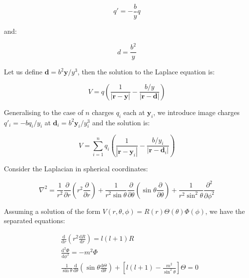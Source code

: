 \documentclass[12pt]{article}
\begin{document}
\begin{equation}
    q' = -\frac{b}{y} q
\end{equation}

and:

\begin{equation}
    d = \frac{b^{2}}{y}
\end{equation}

Let us define $\mathbf{d} = b^{2} \mathbf{y}/y^{3}$, then the solution to the Laplace equation is:

\begin{equation}
    V = q \left( \frac{1}{\left\lvert \mathbf{r} - \mathbf{y} \right\rvert} - \frac{b/y}{\left\lvert \mathbf{r} - \mathbf{d} \right\rvert} \right)
\end{equation}

Generalising to the case of $n$ charges $q_{i}$ each at $\mathbf{y}_{i}$, we introduce image charges $q'_{i} = -bq_{i}/y_{i}$ at $\mathbf{d}_{i} = b^{2} \mathbf{y}_{i}/y_{i}^{3}$ and the solution is:

\begin{equation}
    V = \sum_{i = 1}^{n} q_{i} \left( \frac{1}{\left\lvert \mathbf{r} - \mathbf{y}_{i} \right\rvert} - \frac{b/y_{i}}{\left\lvert \mathbf{r} - \mathbf{d}_{i} \right\rvert} \right)
\end{equation}

Consider the Laplacian in spherical coordinates:

\begin{equation}
    \nabla^{2} = \frac{1}{r^{2}} \frac{\partial}{\partial r} \left( r^{2} \frac{\partial}{\partial r} \right) + \frac{1}{r^{2} \sin{\theta}} \frac{\partial}{\partial \theta} \left( \sin{\theta} \frac{\partial}{\partial \theta} \right) + \frac{1}{r^{2} \sin^{2}{\theta}} \frac{\partial^{2}}{\partial \phi^{2}}
\end{equation}

Assuming a solution of the form $V(r, \theta, \phi) = R(r) \Theta(\theta) \Phi(\phi)$, we have the separated equations:

\begin{equation}
    \begin{split}
        &\frac{\mathrm{d}}{\mathrm{d}r} \left( r^2 \frac{\mathrm{d}R}{\mathrm{d}r} \right) = l(l+1)R \\
        &\frac{\mathrm{d}^{2} \Phi}{\mathrm{d} \phi^2} = -m^2 \Phi \\
        &\frac{1}{\sin{\theta}} \frac{\mathrm{d}}{\mathrm{d} \theta} \left( \sin{\theta} \frac{\mathrm{d} \Theta}{\mathrm{d} \theta} \right) + \left[ l(l+1) - \frac{m^2}{\sin^{2}{\theta}} \right] \Theta = 0
    \end{split}
\end{equation}
\end{document}
